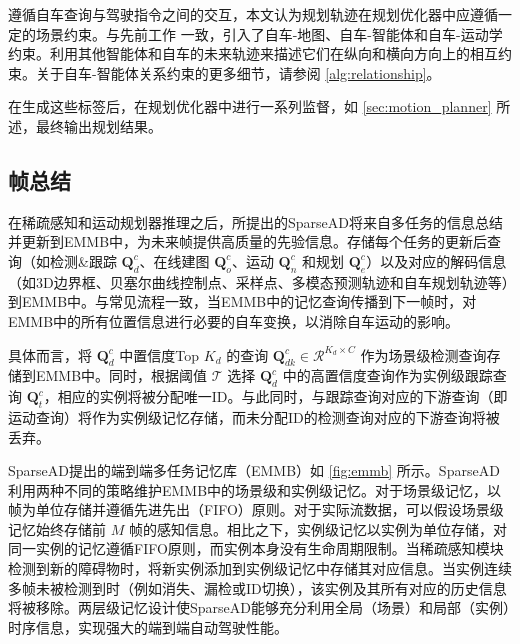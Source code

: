 遵循自车查询与驾驶指令之间的交互，本文认为规划轨迹在规划优化器中应遵循一定的场景约束。与先前工作\cite{jiang2023vad} 一致，引入了自车-地图、自车-智能体和自车-运动学约束。利用其他智能体和自车的未来轨迹来描述它们在纵向和横向方向上的相互约束。关于自车-智能体关系约束的更多细节，请参阅 \cref{alg:relationship}。

在生成这些标签后，在规划优化器中进行一系列监督，如 \cref{sec:motion_planner} 所述，最终输出规划结果。

\subsection{帧总结}
\label{appendix-imple-summary}

在稀疏感知和运动规划器推理之后，所提出的SparseAD将来自多任务的信息总结并更新到EMMB中，为未来帧提供高质量的先验信息。存储每个任务的更新后查询（如检测\&跟踪 $\mathbf{Q}^c_d$、在线建图 $\mathbf{Q}^c_o$、运动 $\mathbf{Q}^c_n$ 和规划 $\mathbf{Q}^c_e$）以及对应的解码信息（如3D边界框、贝塞尔曲线控制点、采样点、多模态预测轨迹和自车规划轨迹等）到EMMB中。与常见流程一致，当EMMB中的记忆查询传播到下一帧时，对EMMB中的所有位置信息进行必要的自车变换，以消除自车运动的影响。

具体而言，将 $\mathbf{Q}^c_d$ 中置信度Top $K_d$ 的查询 $\mathbf{Q}^c_{dk} \in \mathcal{R}^{K_d\times C}$ 作为场景级检测查询存储到EMMB中。同时，根据阈值 $\mathcal{T}$ 选择 $\mathbf{Q}^c_d$ 中的高置信度查询作为实例级跟踪查询 $\mathbf{Q}^c_t$，相应的实例将被分配唯一ID。与此同时，与跟踪查询对应的下游查询（即运动查询）将作为实例级记忆存储，而未分配ID的检测查询对应的下游查询将被丢弃。



SparseAD提出的端到端多任务记忆库（EMMB）如 \cref{fig:emmb} 所示。SparseAD利用两种不同的策略维护EMMB中的场景级和实例级记忆。对于场景级记忆，以帧为单位存储并遵循先进先出（FIFO）原则。对于实际流数据，可以假设场景级记忆始终存储前 $M$ 帧的感知信息。相比之下，实例级记忆以实例为单位存储，对同一实例的记忆遵循FIFO原则，而实例本身没有生命周期限制。当稀疏感知模块检测到新的障碍物时，将新实例添加到实例级记忆中存储其对应信息。当实例连续多帧未被检测到时（例如消失、漏检或ID切换），该实例及其所有对应的历史信息将被移除。两层级记忆设计使SparseAD能够充分利用全局（场景）和局部（实例）时序信息，实现强大的端到端自动驾驶性能。
